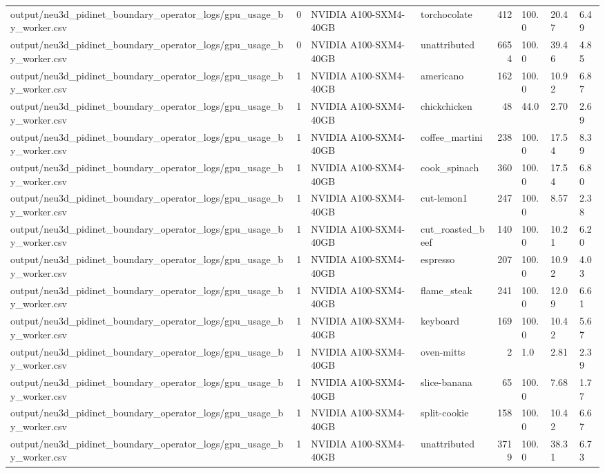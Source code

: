 \documentclass[10pt]{article}
\begin{document}
\begin{longtable}{p{7cm}lllrlll}
output/neu3d\_pidinet\_boundary\_operator\_logs/gpu\_usage\_by\_worker.csv & 0 & NVIDIA A100-SXM4-40GB & torchocolate & 412 & 100.0 & 20.47 & 6.49 \\
output/neu3d\_pidinet\_boundary\_operator\_logs/gpu\_usage\_by\_worker.csv & 0 & NVIDIA A100-SXM4-40GB & unattributed & 6654 & 100.0 & 39.46 & 4.85 \\
output/neu3d\_pidinet\_boundary\_operator\_logs/gpu\_usage\_by\_worker.csv & 1 & NVIDIA A100-SXM4-40GB & americano & 162 & 100.0 & 10.92 & 6.87 \\
output/neu3d\_pidinet\_boundary\_operator\_logs/gpu\_usage\_by\_worker.csv & 1 & NVIDIA A100-SXM4-40GB & chickchicken & 48 & 44.0 & 2.70 & 2.69 \\
output/neu3d\_pidinet\_boundary\_operator\_logs/gpu\_usage\_by\_worker.csv & 1 & NVIDIA A100-SXM4-40GB & coffee\_martini & 238 & 100.0 & 17.54 & 8.39 \\
output/neu3d\_pidinet\_boundary\_operator\_logs/gpu\_usage\_by\_worker.csv & 1 & NVIDIA A100-SXM4-40GB & cook\_spinach & 360 & 100.0 & 17.54 & 6.80 \\
output/neu3d\_pidinet\_boundary\_operator\_logs/gpu\_usage\_by\_worker.csv & 1 & NVIDIA A100-SXM4-40GB & cut-lemon1 & 247 & 100.0 & 8.57 & 2.38 \\
output/neu3d\_pidinet\_boundary\_operator\_logs/gpu\_usage\_by\_worker.csv & 1 & NVIDIA A100-SXM4-40GB & cut\_roasted\_beef & 140 & 100.0 & 10.21 & 6.20 \\
output/neu3d\_pidinet\_boundary\_operator\_logs/gpu\_usage\_by\_worker.csv & 1 & NVIDIA A100-SXM4-40GB & espresso & 207 & 100.0 & 10.92 & 4.03 \\
output/neu3d\_pidinet\_boundary\_operator\_logs/gpu\_usage\_by\_worker.csv & 1 & NVIDIA A100-SXM4-40GB & flame\_steak & 241 & 100.0 & 12.09 & 6.61 \\
output/neu3d\_pidinet\_boundary\_operator\_logs/gpu\_usage\_by\_worker.csv & 1 & NVIDIA A100-SXM4-40GB & keyboard & 169 & 100.0 & 10.42 & 5.67 \\
output/neu3d\_pidinet\_boundary\_operator\_logs/gpu\_usage\_by\_worker.csv & 1 & NVIDIA A100-SXM4-40GB & oven-mitts & 2 & 1.0 & 2.81 & 2.39 \\
output/neu3d\_pidinet\_boundary\_operator\_logs/gpu\_usage\_by\_worker.csv & 1 & NVIDIA A100-SXM4-40GB & slice-banana & 65 & 100.0 & 7.68 & 1.77 \\
output/neu3d\_pidinet\_boundary\_operator\_logs/gpu\_usage\_by\_worker.csv & 1 & NVIDIA A100-SXM4-40GB & split-cookie & 158 & 100.0 & 10.42 & 6.67 \\
output/neu3d\_pidinet\_boundary\_operator\_logs/gpu\_usage\_by\_worker.csv & 1 & NVIDIA A100-SXM4-40GB & unattributed & 3719 & 100.0 & 38.31 & 6.73 \\
\bottomrule
\end{longtable}
\normalsize
\end{document}

